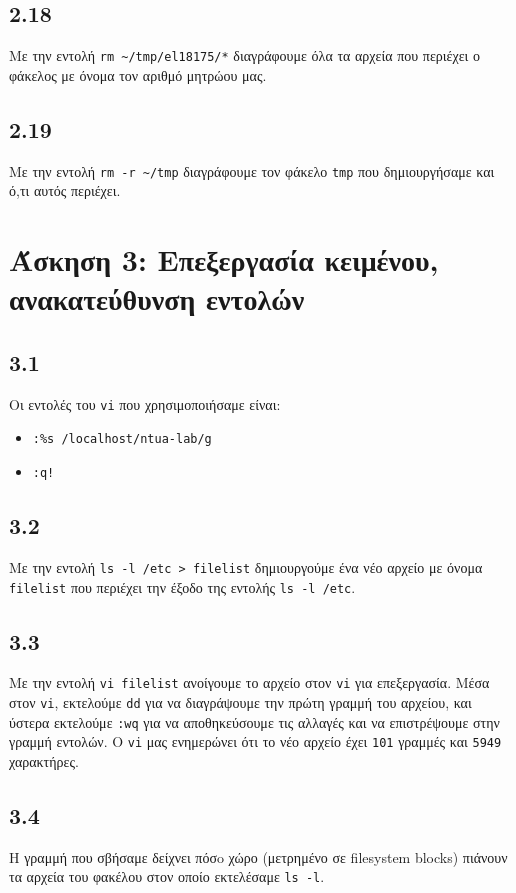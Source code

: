 \documentclass[a4paper, 12pt]{article}
\begin{document}
	\subsection*{2.18}
		Με την εντολή \verb|rm ~/tmp/el18175/*| διαγράφουμε όλα τα αρχεία που περιέχει ο φάκελος με όνομα τον αριθμό μητρώου μας. 

	\subsection*{2.19}
		Με την εντολή \verb|rm -r ~/tmp| διαγράφουμε τον φάκελο \verb|tmp| που δημιουργήσαμε και ό,τι αυτός περιέχει.

\section*{Άσκηση 3: Επεξεργασία κειμένου, ανακατεύθυνση εντολών}

	\subsection*{3.1}
		Οι εντολές του \verb|vi| που χρησιμοποιήσαμε είναι:
			\begin{itemize}
				\item \verb|:%s /localhost/ntua-lab/g|
				\item \verb|:q!|
			\end{itemize}
			
	\subsection*{3.2}
		Με την εντολή \verb|ls -l /etc > filelist| δημιουργούμε ένα νέο αρχείο με όνομα \verb|filelist| που περιέχει την έξοδο της εντολής \verb|ls -l /etc|.

	\subsection*{3.3}
		Με την εντολή \verb|vi filelist| ανοίγουμε το αρχείο στον \verb|vi| για επεξεργασία. Μέσα στον \verb|vi|, εκτελούμε \verb|dd| για να διαγράψουμε την πρώτη γραμμή του αρχείου, και ύστερα εκτελούμε \verb|:wq| για να αποθηκεύσουμε τις αλλαγές και να επιστρέψουμε στην γραμμή εντολών. Ο \verb|vi| μας ενημερώνει ότι το νέο αρχείο έχει \verb|101| γραμμές και \verb|5949| χαρακτήρες.

	\subsection*{3.4}
		Η γραμμή που σβήσαμε δείχνει πόσo χώρο (μετρημένο σε filesystem blocks) πιάνουν τα αρχεία του φακέλου στον οποίο εκτελέσαμε \verb|ls -l|.
\end{document}
